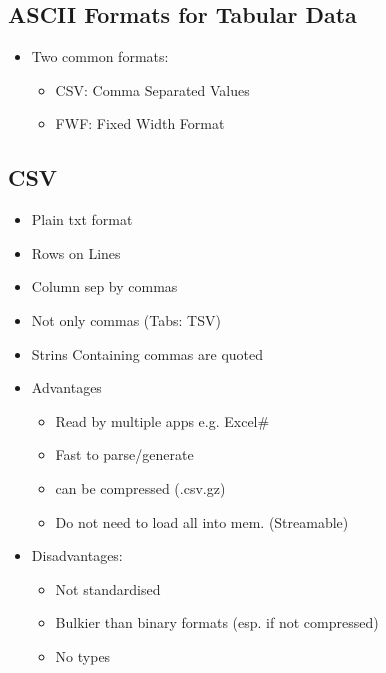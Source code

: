 \documentclass[a4paper]{article}
\begin{document}
\subsection{ASCII Formats for Tabular Data}
\begin{itemize}
	\item Two common formats:
	\begin{itemize}
		\item CSV: Comma Separated Values
		\item FWF: Fixed Width Format
	\end{itemize}
\end{itemize}
\subsection{CSV}
\begin{itemize}
	\item Plain txt format
	\item Rows on Lines
	\item Column sep by commas
	\item Not only commas (Tabs: TSV)
	\item Strins Containing commas are quoted
	\item Advantages
	\begin{itemize}
		\item Read by multiple apps e.g. Excel#
		\item Fast to parse/generate
		\item can be compressed (.csv.gz)
		\item Do not need to load all into mem. (Streamable)
	\end{itemize}
	\item Disadvantages:
	\begin{itemize}
		\item Not standardised
		\item Bulkier than binary formats (esp. if not compressed)
		\item No types
	\end{itemize}
\end{itemize}
\end{document}

